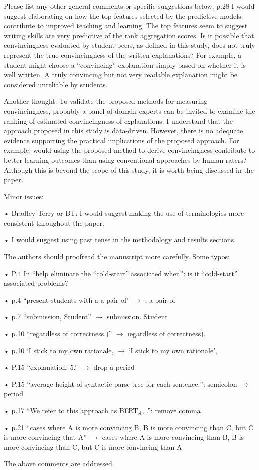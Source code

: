 \documentclass[notitlepage,12pt]{article}
\begin{document}
\begin{revcomment}{Please list any other general comments or specific suggestions below.}
    p.28 I would suggest elaborating on how the top features selected by the predictive models contribute to improved teaching and learning. The top features seem to suggest writing skills are very predictive of the rank aggregation scores. Is it possible that convincingness evaluated by student peers, as defined in this study, does not truly represent the true convincingness of the written explanations? For example, a student might choose a “convincing” explanation simply based on whether it is well written. A truly convincing but not very readable explanation might be considered unreliable by students.

    Another thought: To validate the proposed methods for measuring convincingness, probably a panel of domain experts can be invited to examine the ranking of estimated convincingness of explanations. I understand that the approach proposed in this study is data-driven. However, there is no adequate evidence supporting the practical implications of the proposed approach. For example, would using the proposed method to derive convincingness contribute to better learning outcomes than using conventional approaches by human raters? Although this is beyond the scope of this study, it is worth being discussed in the paper.

    Minor issues:

    • Bradley-Terry or BT: I would suggest making the use of terminologies more consistent throughout the paper.

    • I would suggest using past tense in the methodology and results sections.

    The authors should proofread the manuscript more carefully. Some typos:

    • P.4 In “help eliminate the “cold-start” associated when”: is it “cold-start” associated problems?

    • p.4 “present students with a a pair of” $\rightarrow$ : a pair of

    • p.7 “submission, Student” $\rightarrow$ submission. Student

    • p.10 “regardless of correctness.)” $\rightarrow$ regardless of correctness).

    • p.10 ‘I stick to my own rationale, $\rightarrow$ ‘I stick to my own rationale’,

    • P.15 “explanation. 5.” $\rightarrow$ drop a period

    • P.15 “average height of syntactic parse tree for each sentence;”: semicolon $\rightarrow$ period

    • p.17 “We refer to this approach as BERT$_A$, .”: remove comma

    • p.21 “cases where A is more convincing B, B is more convincing than C, but C is more convincing that A” $\rightarrow$ cases where A is more convincing than B, B is more convincing than C, but C is more convincing than A

    \begin{authors}
      The above comments are addressed.
    \end{authors}


    \end{revcomment}
\end{document}
